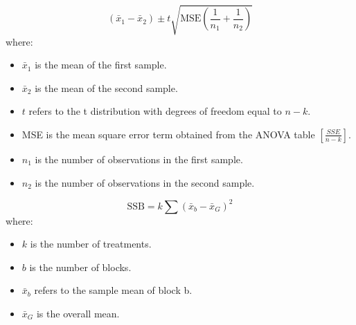 \begin{equation}
\label{confidence interval for the difference in treatment means}
(\bar{x}_{1} - \bar{x}_{2}) \pm t\sqrt{\text{MSE}\left(\frac{1}{n_{1}} + \frac{1}{n_{2}}\right)}
\end{equation}
where:
\begin{itemize}
 \item $\bar{x}_{1}$ is the mean of the first sample.
 \item $\bar{x}_{2}$ is the mean of the second sample.
 \item $t$ refers to the t distribution with degrees of freedom equal to $n-k$. 
 \item MSE is the mean square error term obtained from the ANOVA table $\left[\frac{SSE}{n-k}\right]$.
 \item $n_{1}$ is the number of observations in the first sample.
 \item $n_{2}$ is the number of observations in the second sample.
\end{itemize}
\hformbar


\begin{equation}
\label{sum of squares blocks}
\text{SSB} = k\sum(\bar{x}_{b}-\bar{x}_{G})^{2}
\end{equation}
where:
\begin{itemize}
 \item $k$ is the number of treatments.
 \item $b$ is the number of blocks.
 \item $\bar{x}_{b}$ refers to the sample mean of block b.
 \item $\bar{x}_{G}$ is the overall mean.
\end{itemize}
\hformbar

\newpage
\cleardoublepage



